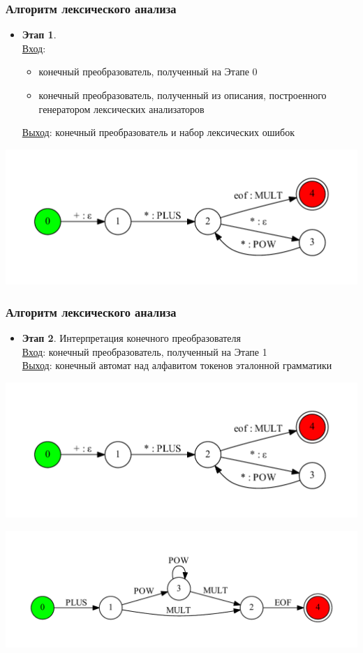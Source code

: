 \documentclass{beamer}
\begin{document}
\begin{frame}[fragile]
\transwipe[direction=90]
\frametitle{Алгоритм лексического анализа}
\begin{itemize}
\item \textbf{Этап 1}.\\
\underline{Вход}: \\ 
\begin{itemize}
\item конечный преобразователь, полученный на Этапе 0
\item конечный преобразователь, полученный из описания, построенного генератором лексических анализаторов
\end{itemize}
\underline{Выход}: конечный преобразователь и набор лексических ошибок
\end{itemize}

\begin{center}
 \includegraphics[width=0.6\linewidth]{calc_ex_compose_1}
\end{center} 

\end{frame}

\begin{frame}[fragile]
\transwipe[direction=90]
\frametitle{Алгоритм лексического анализа}
\begin{itemize}
\item \textbf{Этап 2}. Интерпретация конечного преобразователя \\
\underline{Вход}: конечный преобразователь, полученный на Этапе 1 \\
\underline{Выход}: конечный автомат над алфавитом токенов эталонной грамматики \\
\end{itemize}

\begin{center}
 \includegraphics[width=0.6\linewidth]{calc_ex_compose_1}
\end{center} 

\begin{center}      
    \includegraphics[width=0.8\linewidth]{calc_ex_res}    
\end{center} 
\end{frame}
\end{document}
